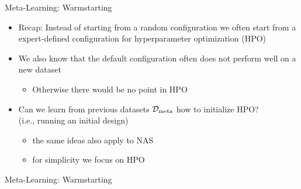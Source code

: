 \begin{frame}[c]{Meta-Learning: Warmstarting}
	
\begin{itemize}
	\item Recap: Instead of starting from a random configuration we often start from a expert-defined configuration for hyperparameter optimization (HPO)
	\pause
	\item We also know that the default configuration often does not perform well on a new dataset
	\begin{itemize}
		\item Otherwise there would be no point in HPO
	\end{itemize}
	\pause
	\item \alert{Can we learn from previous datasets $\mathcal{D}_{\text{meta}}$ how to initialize HPO?}\\
	(i.e., running an initial design)
	\begin{itemize}
		\item the same ideas also apply to NAS
		\item for simplicity we focus on HPO 
	\end{itemize}
\end{itemize}

\end{frame}
\begin{frame}[c]{Meta-Learning: Warmstarting}
	

\end{frame}
